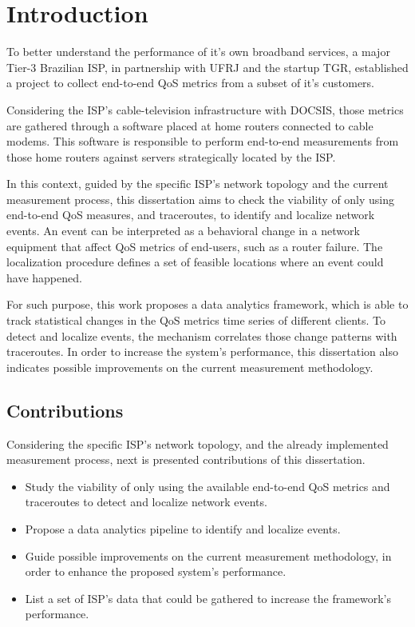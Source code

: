 \chapter{Introduction}

To better understand the performance of it's own broadband services, a major
Tier-3 Brazilian ISP, in partnership with UFRJ and the startup TGR,
established a project to collect end-to-end QoS metrics from a subset
of it's customers.

Considering the ISP's cable-television infrastructure with DOCSIS,
those metrics are gathered through a software placed at home routers connected
to cable modems. This software is responsible to perform end-to-end
measurements from those home routers against servers strategically
located by the ISP\@.

In this context, guided by the specific ISP's network topology
and the current measurement process,
this dissertation aims to check the viability of
only using end-to-end QoS measures, and traceroutes,
to identify and localize network events. An event can be interpreted as a
behavioral change in a network equipment that affect QoS metrics of end-users,
such as a router failure. The localization procedure defines a set of
feasible locations where an event could have happened.

For such purpose, this work proposes a data analytics framework, which is able
to track statistical changes in the QoS metrics time series of different
clients.
To detect and localize events, the mechanism correlates those change
patterns with traceroutes.
In order to increase the system's performance,
this dissertation also indicates possible improvements on the current
measurement methodology.

\section{Contributions}

Considering the specific ISP's network topology, and the already implemented
measurement process, next is presented contributions of this dissertation.

\begin{itemize}
\item
Study the viability of only using the available end-to-end QoS metrics and
traceroutes to detect and localize network events.

\item Propose a data analytics pipeline to identify and localize events.

\item Guide possible improvements on the current measurement methodology,
in order to enhance the proposed system's performance.

\item List a set of ISP's data that could be gathered to increase the
framework's performance.

\end{itemize}

